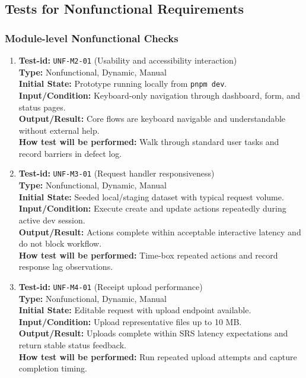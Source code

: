 \documentclass[12pt, titlepage]{article}
\begin{document}
\subsection{Tests for Nonfunctional Requirements}

\subsubsection{Module-level Nonfunctional Checks}

\begin{enumerate}

\item \textbf{Test-id:} \texttt{UNF-M2-01} (Usability and accessibility interaction)\\
\textbf{Type:} Nonfunctional, Dynamic, Manual\\
\textbf{Initial State:} Prototype running locally from \texttt{pnpm dev}.\\
\textbf{Input/Condition:} Keyboard-only navigation through dashboard, form, and status pages.\\
\textbf{Output/Result:} Core flows are keyboard navigable and understandable without external help.\\
\textbf{How test will be performed:} Walk through standard user tasks and record barriers in defect log.

\item \textbf{Test-id:} \texttt{UNF-M3-01} (Request handler responsiveness)\\
\textbf{Type:} Nonfunctional, Dynamic, Manual\\
\textbf{Initial State:} Seeded local/staging dataset with typical request volume.\\
\textbf{Input/Condition:} Execute create and update actions repeatedly during active dev session.\\
\textbf{Output/Result:} Actions complete within acceptable interactive latency and do not block workflow.\\
\textbf{How test will be performed:} Time-box repeated actions and record response lag observations.

\item \textbf{Test-id:} \texttt{UNF-M4-01} (Receipt upload performance)\\
\textbf{Type:} Nonfunctional, Dynamic, Manual\\
\textbf{Initial State:} Editable request with upload endpoint available.\\
\textbf{Input/Condition:} Upload representative files up to 10 MB.\\
\textbf{Output/Result:} Uploads complete within SRS latency expectations and return stable status feedback.\\
\textbf{How test will be performed:} Run repeated upload attempts and capture completion timing.


\end{enumerate}
\end{document}
